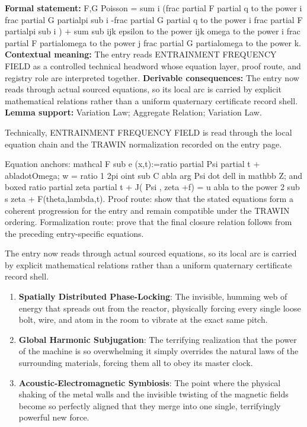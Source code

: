 \begingroup\footnotesize\setlength{\emergencystretch}{3em}\sloppy
\textbf{Formal statement:} F,G Poisson = sum i (frac partial F partial q to the power i frac partial G partialpi sub i -frac partial G partial q to the power i frac partial F partialpi sub i ) + sum sub ijk epsilon to the power ijk omega to the power i frac partial F partialomega to the power j frac partial G partialomega to the power k. \textbf{Contextual meaning:} The entry reads ENTRAINMENT FREQUENCY FIELD as a controlled technical headword whose equation layer, proof route, and registry role are interpreted together. \textbf{Derivable consequences:} The entry now reads through actual sourced equations, so its local arc is carried by explicit mathematical relations rather than a uniform quaternary certificate record shell. \textbf{Lemma support:} Variation Law; Aggregate Relation; Variation Law.\par
\endgroup

Technically, ENTRAINMENT FREQUENCY FIELD is read through the local equation chain and the TRAWIN normalization recorded on the entry page.

Equation anchors: mathcal F sub e (x,t):=ratio partial Psi partial t + abladotOmega; w = ratio 1 2pi oint sub C abla arg Psi dot dell in mathbb Z; and boxed ratio partial zeta partial t + J( Psi , zeta +f) = u abla to the power 2 sub s zeta + F(theta,lambda,t). Proof route: show that the stated equations form a coherent progression for the entry and remain compatible under the TRAWIN ordering. Formalization route: prove that the final closure relation follows from the preceding entry-specific equations.

The entry now reads through actual sourced equations, so its local arc is carried by explicit mathematical relations rather than a uniform quaternary certificate record shell.
\endgroup

\begin{enumerate}[leftmargin=1.6em,itemsep=6pt,topsep=4pt]
\item \textbf{Spatially Distributed Phase-Locking}: The invisible, humming web of energy that spreads out from the reactor, physically forcing every single loose bolt, wire, and atom in the room to vibrate at the exact same pitch.
\item \textbf{Global Harmonic Subjugation}: The terrifying realization that the power of the machine is so overwhelming it simply overrides the natural laws of the surrounding materials, forcing them all to obey its master clock.
\item \textbf{Acoustic-Electromagnetic Symbiosis}: The point where the physical shaking of the metal walls and the invisible twisting of the magnetic fields become so perfectly aligned that they merge into one single, terrifyingly powerful new force.
\end{enumerate}

